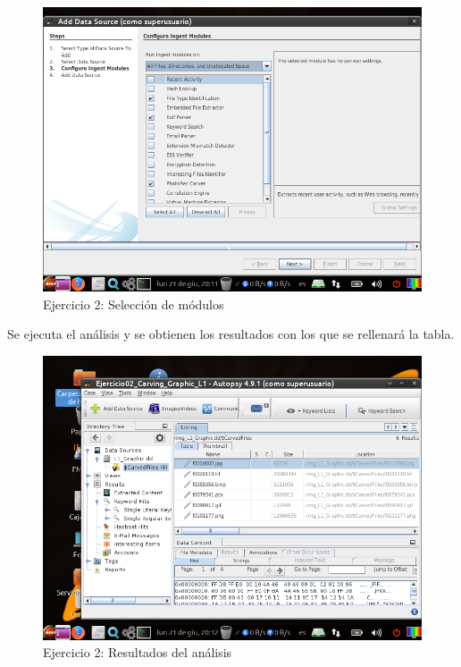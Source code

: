 \documentclass[11pt]{article}
\begin{document}
\begin{figure}[H]
    \caption{Ejercicio 2: Selección de módulos}
    \centering
    \includegraphics[scale=0.7]{e2-4.png}
\end{figure}

Se ejecuta el análisis y se obtienen los resultados con los que se rellenará la tabla.

\begin{figure}[H]
    \caption{Ejercicio 2: Resultados del análisis}
    \centering
    \includegraphics[scale=0.7]{e2-5.png}
\end{figure}
\end{document}
